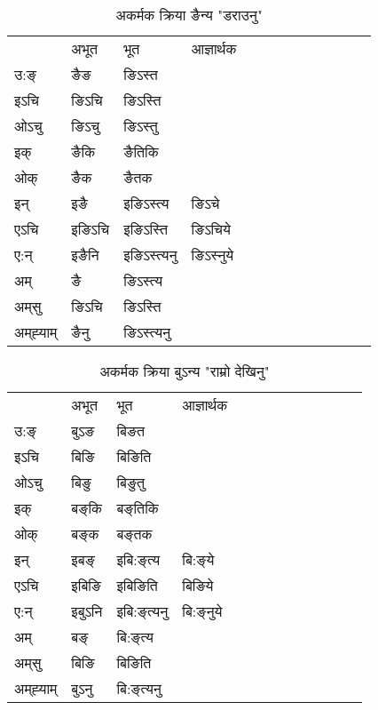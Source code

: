 \begin{table}[H]
\centering
\caption{\label{in.vi} अकर्मक क्रिया  ङैन्य  "डराउनु"  }
\begin{tabular}{l|l|l|l|l|l|l|l|l|l|l|l|l}  \toprule
&अभूत & भूत & आज्ञार्थक \\ 
उ:ङ्‌ &ङैङ &ङिऽस्त \\ 
इऽचि &ङिऽचि &ङिऽस्ति   \\ 
ओऽचु &ङिऽचु &ङिऽस्तु   \\ 
इक् &ङैकि &ङैतिकि   \\ 
ओक् &ङैक &ङैतक   \\ 
इन् & इङै & इङिऽस्त्य &ङिऽचे  \\ 
एऽचि & इङिऽचि & इङिऽस्ति &ङिऽचिये    \\ 
ए:न् & इङैनि  & इङिऽस्त्यनु &ङिऽस्‍नुये  \\ 
अम् & ङै & ङिऽस्त्य   \\ 
अम्‌सु & ङिऽचि & ङिऽस्ति   \\ 
अम्‌ह्‍याम् & ङैनु  & ङिऽस्त्यनु \\ 
\bottomrule
\end{tabular}
\end{table}


\begin{table}[H]
\centering
\caption{\label{iŋ.vi} अकर्मक क्रिया  बुऽन्य  "राम्रो देखिनु"  }
\begin{tabular}{l|l|l|l|l|l|l|l|l|l|l|l|l}  \toprule
&अभूत & भूत & आज्ञार्थक \\ 
उ:ङ्‌ &बुऽङ &बिङत \\ 
इऽचि &बिङि &बिङिति   \\ 
ओऽचु &बिङु &बिङुतु   \\ 
इक् &बङ्‌कि &बङ्‌तिकि   \\ 
ओक् &बङ्‌क &बङ्‌तक   \\ 
इन् & इबङ्‌ & इबि:ङ्‌त्य &बि:ङ्‌ये  \\ 
एऽचि & इबिङि & इबिङिति &बिङिये    \\ 
ए:न् & इबुऽनि  & इबि:ङ्‌त्यनु &बि:ङ्‌नुये  \\ 
अम् & बङ्‌ & बि:ङ्‌त्य   \\ 
अम्‌सु & बिङि & बिङिति   \\ 
अम्‌ह्‍याम् & बुऽनु  & बि:ङ्‌त्यनु \\ 
\bottomrule
\end{tabular}
\end{table}




